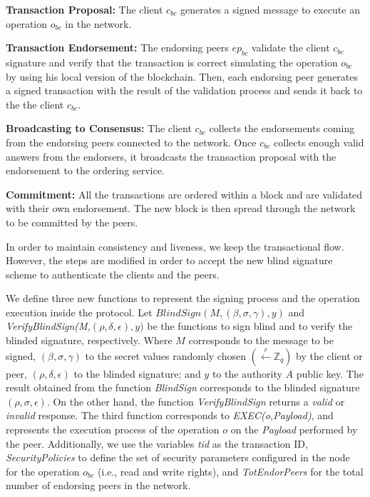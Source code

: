 \documentclass[conference]{llncs}
\begin{document}
\begin{compactenum}
    \item \textbf{Transaction Proposal:}  The client $c_{bc}$ generates a signed message to execute an operation $o_{bc}$ in the network.
    \item \textbf{Transaction Endorsement:} The endorsing peers $ep_{bc}$ validate the client $c_{bc}$ signature and verify that the transaction is correct simulating the operation $o_{bc}$ by using his local version of the blockchain. Then, each endorsing peer generates a signed transaction with the result of the validation process and sends it back to the the client $c_{bc}$.
    \item \textbf{Broadcasting to Consensus:} The client $c_{bc}$ collects the endorsements coming from the endorsing peers connected to the network. Once $c_{bc}$ collects enough valid answers from the endorsers, it broadcasts the transaction proposal with the endorsement to the ordering service.
    \item \textbf{Commitment:} All the transactions are ordered within a block and are validated with their own endorsement. The new block is then spread through the network to be committed by the peers.
\end{compactenum}

In order to maintain consistency and liveness, we keep the transactional flow. However, the steps are modified in order to accept the new blind signature scheme to authenticate the clients and the peers.

We define three new functions to represent the signing process and the operation execution inside the protocol. Let $BlindSign(M,(\beta,\sigma,\gamma),y)$ and \textit{VerifyBlindSign(M,}$(\rho,\delta,\epsilon),y)$ be the functions to sign blind and to verify the blinded signature, respectively. Where $M$ corresponds to the message to be signed, $(\beta,\sigma,\gamma)$ to the secret values randomly chosen $(\xleftarrow[]{r}\mathbb{Z}_q)$ by the client or peer, $(\rho,\delta,\epsilon)$ to the blinded signature; and $y$ to the authority $A$ public key. The result obtained from the function \textit{BlindSign} corresponds to the blinded signature $(\rho,\sigma,\epsilon)$. On the other hand, the function \textit{VerifyBlindSign} returns a \textit{valid} or \textit{invalid} response. The third function corresponds to \textit{EXEC(o,Payload)}, and represents the execution process of the operation $o$ on the \textit{Payload} performed by the peer. Additionally, we use the variables \textit{tid} as the transaction ID, \textit{SecurityPolicies} to define the set of security parameters configured in the node for the operation $o_{bc}$ (i.e., read and write rights), and \textit{TotEndorPeers} for the total number of endorsing peers in the network.
\end{document}
